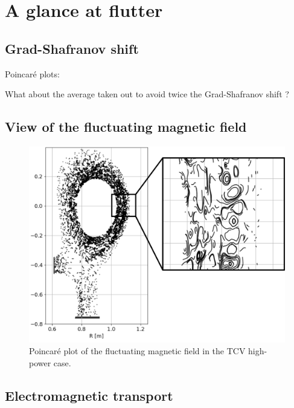 \section{A glance at flutter}

\subsection{Grad-Shafranov shift}

Poincaré plots:

What about the average taken out to avoid twice the Grad-Shafranov shift ? 


\subsection{View of the fluctuating magnetic field}


\begin{figure}[H]\centering
	\centering
	\includegraphics[width=1\textwidth]{schemes/poincareFlutterHighPower.png}
	\caption{Poincaré plot of the fluctuating magnetic field in the TCV high-power case.}
	\label{fig:TCV_poincareFlutter}
\end{figure}


\subsection{Electromagnetic transport}






